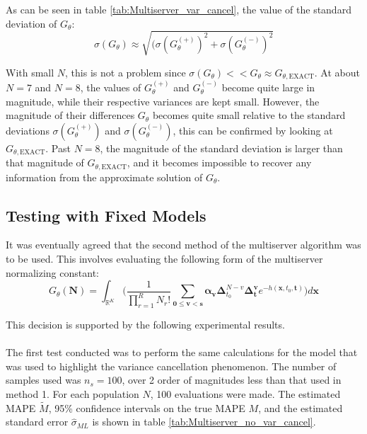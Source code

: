As can be seen in table \ref{tab:Multiserver_var_cancel}, the value of the standard deviation of \(G_\theta\):  \[\sigma(G_\theta) \approx \sqrt{(\sigma(G_\theta^{(+)})^2 + \sigma(G_\theta^{(-)})^2} \]

With small \(N\), this is not a problem since \(\sigma(G_\theta) << G_\theta \approx G_{\theta, \text{EXACT}}\). At about \(N=7\) and \(N=8\), the values of \(G_{\theta}^{(+)}\) and \(G_{\theta}^{(-)}\) become quite large in magnitude, while their respective variances are kept small. However, the magnitude of their differences \(G_\theta\) becomes quite small relative to the standard deviations \(\sigma(G_{\theta}^{(+)})\) and \(\sigma(G_{\theta}^{(-)})\), this can be confirmed by looking at \(G_{\theta,\text{EXACT}}\). Past \(N=8\), the magnitude of the standard deviation is larger than that magnitude of \(G_{\theta,\text{EXACT}}\), and it becomes impossible to recover any information from the approximate solution of \(G_\theta\). 

\subsection{Testing with Fixed Models}

It was eventually agreed that the second method of the multiserver algorithm was to be used. This involves evaluating the following form of the multiserver normalizing constant:
\begin{equation*}
    G_\theta(\mathbf{N}) = \int_{\mathbb{R}^K} \bigg( \frac{1}{\prod_{r=1}^R N_r!} \sum_{\mathbf{0 \leq v <s}} \mathbf{\alpha_v} \boldsymbol{\Delta}_{t_0}^{N-v} \boldsymbol{\Delta}_{\mathbf{t}}^{\mathbf{v}} e^{-h(\mathbf x, t_0, \mathbf{t})}  \bigg) d \mathbf{x}
\end{equation*}

This decision is supported by the following experimental results. 
\\\\
The first test conducted was to perform the same calculations for the model that was used to highlight the variance cancellation phenomenon. The number of samples used was \(n_s=100\), over 2 order of magnitudes less than that used in method 1. For each population \(N\), 100 evaluations were made. The estimated MAPE \(\tilde{M}\), 95\% confidence intervals on the true MAPE \(M\), and the estimated standard error \(\hat{\sigma}_{ML}\) is shown in table \ref{tab:Multiserver_no_var_cancel}. \\

